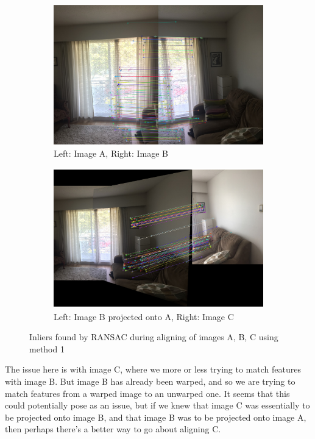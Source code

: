 \documentclass[]{article}
\begin{document}
\begin{figure}[h]
	\begin{subfigure}[h]{0.5\textwidth}
		\includegraphics[scale=0.35]{results/SIFT_indifference/method1/7}
		\centering
		\caption{Left: Image A, Right: Image B}
	\end{subfigure}%
	\hfill
	\begin{subfigure}[h]{0.5\textwidth}
		\includegraphics[scale=0.35]{results/SIFT_indifference/method1/15}
		\centering
		\caption{Left: Image B projected onto A, Right: Image C}
	\end{subfigure}%
	\centering
	\caption{Inliers found by RANSAC during aligning of images A, B, C using method 1}
\end{figure}

The issue here is with image C, where we more or less trying to match features with image B. But image B has already been warped, and so we are trying to match features from a warped image to an unwarped one. It seems that this could potentially pose as an issue, but if we knew that image C was essentially to be projected onto image B, and that image B was to be projected onto image A, then perhaps there's a better way to go about aligning C.
\end{document}
